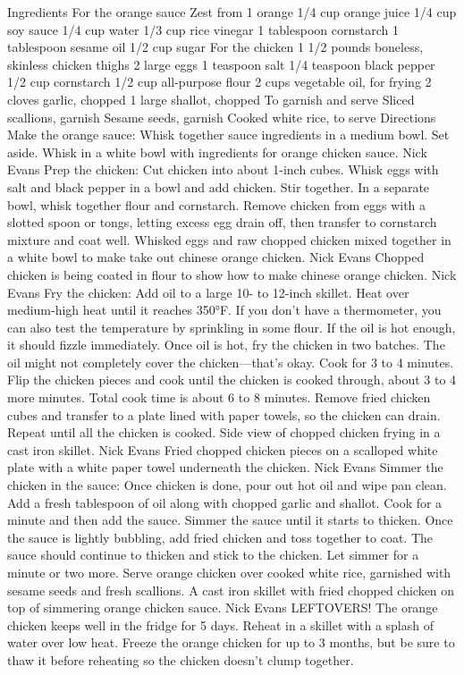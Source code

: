 Ingredients For the orange sauce Zest from 1 orange 1/4 cup orange juice 1/4 cup soy sauce 1/4 cup water 1/3 cup rice vinegar 1 tablespoon cornstarch 1 tablespoon sesame oil 1/2 cup sugar For the chicken 1 1/2 pounds boneless, skinless chicken thighs 2 large eggs 1 teaspoon salt 1/4 teaspoon black pepper 1/2 cup cornstarch 1/2 cup all-purpose flour 2 cups vegetable oil, for frying 2 cloves garlic, chopped 1 large shallot, chopped To garnish and serve Sliced scallions, garnish Sesame seeds, garnish Cooked white rice, to serve Directions Make the orange sauce: Whisk together sauce ingredients in a medium bowl. Set aside. Whisk in a white bowl with ingredients for orange chicken sauce. Nick Evans Prep the chicken: Cut chicken into about 1-inch cubes. Whisk eggs with salt and black pepper in a bowl and add chicken. Stir together. In a separate bowl, whisk together flour and cornstarch. Remove chicken from eggs with a slotted spoon or tongs, letting excess egg drain off, then transfer to cornstarch mixture and coat well. Whisked eggs and raw chopped chicken mixed together in a white bowl to make take out chinese orange chicken. Nick Evans Chopped chicken is being coated in flour to show how to make chinese orange chicken. Nick Evans Fry the chicken: Add oil to a large 10- to 12-inch skillet. Heat over medium-high heat until it reaches 350°F. If you don’t have a thermometer, you can also test the temperature by sprinkling in some flour. If the oil is hot enough, it should fizzle immediately. Once oil is hot, fry the chicken in two batches. The oil might not completely cover the chicken—that’s okay. Cook for 3 to 4 minutes. Flip the chicken pieces and cook until the chicken is cooked through, about 3 to 4 more minutes. Total cook time is about 6 to 8 minutes. Remove fried chicken cubes and transfer to a plate lined with paper towels, so the chicken can drain. Repeat until all the chicken is cooked. Side view of chopped chicken frying in a cast iron skillet. Nick Evans Fried chopped chicken pieces on a scalloped white plate with a white paper towel underneath the chicken. Nick Evans Simmer the chicken in the sauce: Once chicken is done, pour out hot oil and wipe pan clean. Add a fresh tablespoon of oil along with chopped garlic and shallot. Cook for a minute and then add the sauce. Simmer the sauce until it starts to thicken. Once the sauce is lightly bubbling, add fried chicken and toss together to coat. The sauce should continue to thicken and stick to the chicken. Let simmer for a minute or two more. Serve orange chicken over cooked white rice, garnished with sesame seeds and fresh scallions. A cast iron skillet with fried chopped chicken on top of simmering orange chicken sauce. Nick Evans LEFTOVERS! The orange chicken keeps well in the fridge for 5 days. Reheat in a skillet with a splash of water over low heat. Freeze the orange chicken for up to 3 months, but be sure to thaw it before reheating so the chicken doesn’t clump together.
\par

